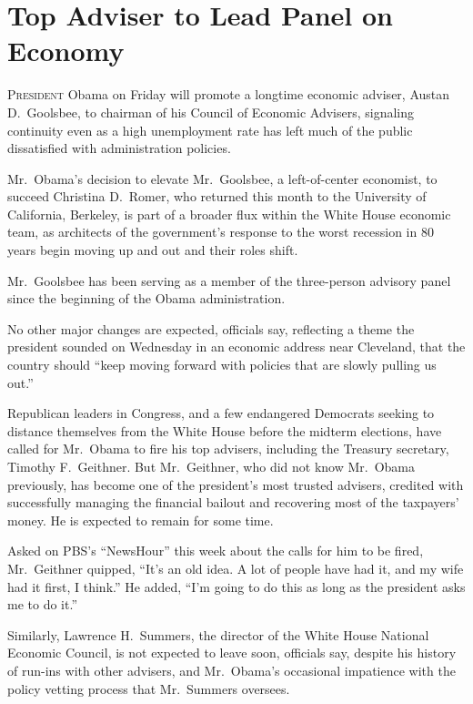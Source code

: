 ﻿\documentclass[12pt]{article}
\begin{document}
\pagebreak
\section{Top Adviser to Lead Panel on Economy}

\lettrine{P}{resident} Obama on Friday will promote a longtime economic
adviser, Austan D.~Goolsbee, to chairman of his Council of Economic Advisers, signaling continuity
even as a high unemployment rate has left much of the public dissatisfied with administration
policies.

Mr.~Obama's decision to elevate Mr.~Goolsbee, a left-of-center economist, to succeed Christina
D.~Romer, who returned this month to the University of California, Berkeley, is part of a broader
flux within the White House economic team, as architects of the government's response to the worst
recession in 80 years begin moving up and out and their roles shift.

Mr.~Goolsbee has been serving as a member of the three-person advisory panel since the beginning of
the Obama administration.

No other major changes are expected, officials say, reflecting a theme the president sounded on
Wednesday in an economic address near Cleveland, that the country should ``keep moving forward with
policies that are slowly pulling us out.''

Republican leaders in Congress, and a few endangered Democrats seeking to distance themselves from
the White House before the midterm elections, have called for Mr.~Obama to fire his top advisers,
including the Treasury secretary, Timothy F.~Geithner. But Mr.~Geithner, who did not know Mr.~Obama
previously, has become one of the president's most trusted advisers, credited with successfully
managing the financial bailout and recovering most of the taxpayers' money. He is expected to remain
for some time.

Asked on PBS's ``NewsHour'' this week about the calls for him to be fired, Mr.~Geithner quipped,
``It's an old idea. A lot of people have had it, and my wife had it first, I think.'' He added,
``I'm going to do this as long as the president asks me to do it.''

Similarly, Lawrence H.~Summers, the director of the White House National Economic Council, is not
expected to leave soon, officials say, despite his history of run-ins with other advisers, and
Mr.~Obama's occasional impatience with the policy vetting process that Mr.~Summers oversees.
\end{document}
